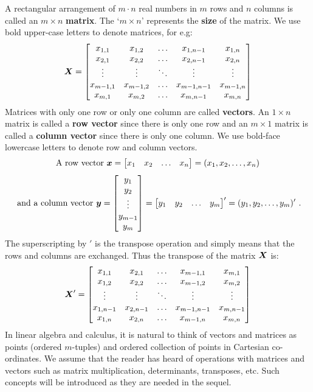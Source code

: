 A rectangular arrangement of $m \cdot n$ real numbers in $m$ rows and $n$ columns is called an $m \times n$ {\bf matrix}.  The `$m \times n$' represents the {\bf size} of the matrix.  We use bold upper-case letters to denote matrices, for e.g:
$$ 
\X = \begin{bmatrix}
x_{1,1} & x_{1,2} & \ldots & x_{1,n-1} & x_{1,n} \\
x_{2,1} & x_{2,2} & \ldots & x_{2,n-1} & x_{2,n} \\
\vdots & \vdots & \ddots & \vdots & \vdots \\
x_{m-1,1} & x_{m-1,2} & \ldots & x_{m-1,n-1} & x_{m-1,n} \\
x_{m,1} & x_{m,2} & \ldots & x_{m,n-1} & x_{m,n} 
\end{bmatrix}
$$
Matrices with only one row or only one column are called {\bf vectors}.  An $1 \times n$ matrix is called a {\bf row vector} since there is only one row and an $m \times 1$ matrix is called a {\bf column vector} since there is only one column.  We use bold-face lowercase letters to denote row and column vectors.
$$ 
\text{A row vector } \x = \begin{bmatrix}
x_{1} & x_{2} & \ldots & x_{n}
\end{bmatrix} = (x_1,x_2,\ldots,x_n)
$$
$$
\text{ and a column vector } \y = 
\begin{bmatrix}
y_{1} \\
y_{2}  \\
\vdots \\
y_{m-1} \\
y_{m} 
\end{bmatrix}  
= \begin{bmatrix}
y_{1} & y_{2} & \ldots & y_{m}
\end{bmatrix}'
= (y_1,y_2,\ldots,y_m)' \ .
$$
The superscripting by $'$ is the transpose operation and simply means that the rows and columns are exchanged.  Thus the transpose of the matrix $\X$ is:
$$ 
\X' = \begin{bmatrix}
x_{1,1} & x_{2,1} & \ldots & x_{m-1,1} & x_{m,1} \\
x_{1,2} & x_{2,2} & \ldots & x_{m-1,2} & x_{m,2} \\
\vdots & \vdots & \ddots & \vdots & \vdots \\
x_{1,n-1} & x_{2,n-1} & \ldots & x_{m-1,n-1} & x_{m,n-1} \\
x_{1,n} & x_{2,n} & \ldots & x_{m-1,n} & x_{m,n} 
\end{bmatrix}
$$
In linear algebra and calculus, it is natural to think of vectors and matrices as points (ordered $m$-tuples) and ordered collection of points in Cartesian co-ordinates.  We assume that the reader has heard of operations with matrices and vectors such as matrix multiplication, determinants, transposes, etc.  Such concepts will be introduced as they are needed in the sequel.

